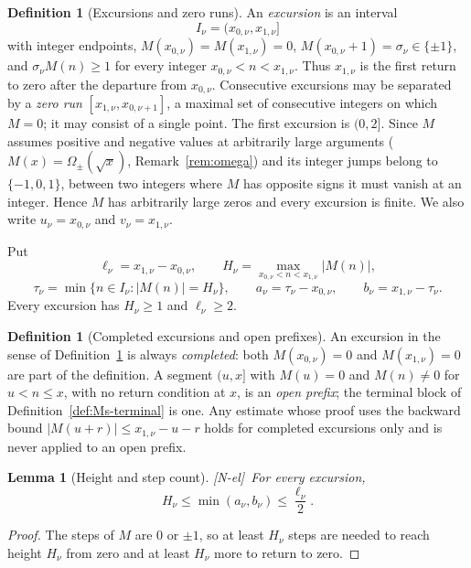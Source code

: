 \documentclass[11pt]{amsart}
\numberwithin{equation}{section}
\theoremstyle{plain}
\newtheorem{lemma}[theorem]{Lemma}
\theoremstyle{definition}
\newtheorem{definition}[theorem]{Definition}
\theoremstyle{remark}
\newcommand{\tagNE}{\textup{[N-el]}}
\begin{document}
\begin{definition}[Excursions and zero runs]
\label{def:excursion}
An \emph{excursion} is an interval
\[
I_\nu=(x_{0,\nu},x_{1,\nu}]
\]
with integer endpoints, $M(x_{0,\nu})=M(x_{1,\nu})=0$,
$M(x_{0,\nu}+1)=\sigma_\nu\in\{\pm1\}$, and
$\sigma_\nu M(n)\ge1$ for every integer $x_{0,\nu}<n<x_{1,\nu}$. Thus
$x_{1,\nu}$ is the first return to zero after the departure from
$x_{0,\nu}$. Consecutive excursions may be separated by a \emph{zero run}
$[x_{1,\nu},x_{0,\nu+1}]$, a maximal set of consecutive integers on which
$M=0$; it may consist of a single point. The first excursion is $(0,2]$.
Since $M$ assumes positive and negative values at arbitrarily large
arguments ($M(x)=\Omega_\pm(\sqrt x)$, Remark~\ref{rem:omega}) and its
integer jumps belong to $\{-1,0,1\}$, between two integers where $M$ has
opposite signs it must vanish at an integer.  Hence $M$ has arbitrarily large zeros and every
excursion is finite. We also write $u_\nu=x_{0,\nu}$ and
$v_\nu=x_{1,\nu}$.

Put
\[
\ell_\nu=x_{1,\nu}-x_{0,\nu},\qquad
H_\nu=\max_{x_{0,\nu}<n<x_{1,\nu}}|M(n)|,
\]
\[
\tau_\nu=\min\{n\in I_\nu:|M(n)|=H_\nu\},\qquad
a_\nu=\tau_\nu-x_{0,\nu},\qquad b_\nu=x_{1,\nu}-\tau_\nu.
\]
Every excursion has $H_\nu\ge1$ and $\ell_\nu\ge2$.
\end{definition}

\begin{definition}[Completed excursions and open prefixes]
\label{def:completed-open}
An excursion in the sense of Definition~\ref{def:excursion} is always
\emph{completed}: both $M(x_{0,\nu})=0$ and $M(x_{1,\nu})=0$ are part of
the definition. A segment $(u,x]$ with $M(u)=0$ and $M(n)\ne0$ for
$u<n\le x$, with no return condition at $x$, is an \emph{open prefix}; the
terminal block of Definition~\ref{def:Ms-terminal} is one. Any estimate
whose proof uses the backward bound $|M(u+r)|\le x_{1,\nu}-u-r$ holds for
completed excursions only and is never applied to an open prefix.
\end{definition}

\begin{lemma}[Height and step count]
\label{lem:height_steps}
\tagNE\ For every excursion,
\begin{equation}
\label{eq:height_steps}
H_\nu\le\min(a_\nu,b_\nu)\le\frac{\ell_\nu}{2}.
\end{equation}
\end{lemma}

\begin{proof}
The steps of $M$ are $0$ or $\pm1$, so at least $H_\nu$ steps are needed to
reach height $H_\nu$ from zero and at least $H_\nu$ more to return to zero.
\end{proof}
\end{document}
